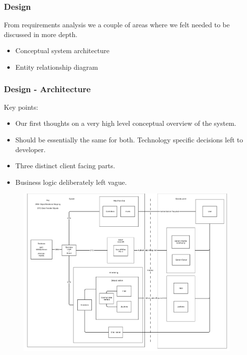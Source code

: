 \documentclass[10pt, compress]{beamer}
\begin{document}

\begin{frame}[fragile]
  \frametitle{Design}
  
   \small{ 
   	
   		From requirements analysis we a couple of areas where we felt needed to be discussed in more depth.
   		
   		\begin{itemize}
			\item Conceptual system architecture
   			\item Entity relationship diagram
   		\end{itemize}
     
   }

\end{frame}

\begin{frame}[fragile]
  \frametitle{Design - Architecture}
  
   \small{
   	 Key points:

     \begin{itemize}
     	\item Our first thoughts on a very high level conceptual overview of the system.
   		\item Should be essentially the same for both. Technology specific decisions left to developer.
   		\item Three distinct client facing parts.
   		\item Business logic deliberately left vague.
   	  \end{itemize}
   	  
   	  \begin{figure}
	  \begin{center}
      \includegraphics[width=1.0\textwidth]{../design/system/groupproject_systemarchitecture.png}
	  \end{center}
	  \end{figure}
   }

\end{frame}
\end{document}
